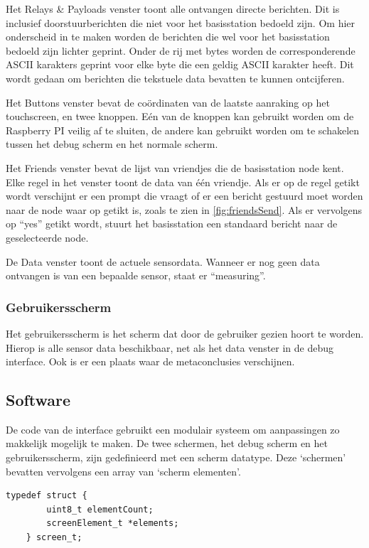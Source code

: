 Het Relays \& Payloads venster toont alle ontvangen directe berichten. Dit is inclusief doorstuurberichten die niet voor het basisstation bedoeld zijn. Om hier onderscheid in te maken worden de berichten die wel voor het basisstation bedoeld zijn lichter geprint. Onder de rij met bytes worden de corresponderende ASCII karakters geprint voor elke byte die een geldig ASCII karakter heeft. Dit wordt gedaan om berichten die tekstuele data bevatten te kunnen ontcijferen.

Het Buttons venster bevat de coördinaten van de laatste aanraking op het touchscreen, en twee knoppen. Eén van de knoppen kan gebruikt worden om de Raspberry PI veilig af te sluiten, de andere kan gebruikt worden om te schakelen tussen het debug scherm en het normale scherm.

Het Friends venster bevat de lijst van vriendjes die de basisstation node kent. Elke regel in het venster toont de data van één vriendje. Als er op de regel getikt wordt verschijnt er een prompt die vraagt of er een bericht gestuurd moet worden naar de node waar op getikt is, zoals te zien in \autoref{fig:friendsSend}. Als er vervolgens op ``yes'' getikt wordt, stuurt het basisstation een standaard bericht naar de geselecteerde node.

De Data venster toont de actuele sensordata. Wanneer er nog geen data ontvangen is van een bepaalde sensor, staat er ``measuring''.

\subsubsection*{Gebruikersscherm}
Het gebruikersscherm is het scherm dat door de gebruiker gezien hoort te worden. Hierop is alle sensor data beschikbaar, net als het data venster in de debug interface. Ook is er een plaats waar de metaconclusies verschijnen.




\subsection{Software}
De code van de interface gebruikt een modulair systeem om aanpassingen zo makkelijk mogelijk te maken. De twee schermen, het debug scherm en het gebruikersscherm, zijn gedefinieerd met een scherm datatype.
Deze `schermen' bevatten vervolgens een array van `scherm elementen'.

\begin{lstlisting}[caption={Het datatype van de schermen},captionpos=b,label={lst:screen_t},style=c,xleftmargin=.\textwidth,xrightmargin=.\textwidth]
    typedef struct {
        uint8_t elementCount;
        screenElement_t *elements;
    } screen_t;
\end{lstlisting}

